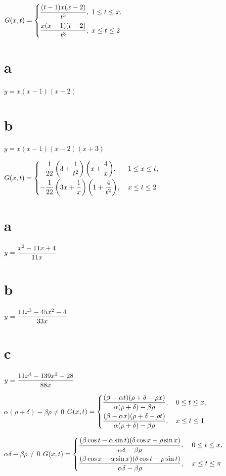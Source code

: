 \smallskip
{}
$G(x,t)=
\begin{cases}
\displaystyle{\frac{(t-1)x(x-2)}{t^{3}}},\;  1\le t\le x,\\[.11in]
\displaystyle{\frac{x(x-1)(t-2)}{t^{3}}},\;   x\le t\le 2
\end{cases}$
\part{a} $y=x(x-1)(x-2)$\;
\part{b} $y=x(x-1)(x-2)(x+3)$

\smallskip
{}
$G(x,t)=
\begin{cases}
-\displaystyle{\frac{1}{22}\left(3+\frac{1}{t^{2}}\right)\left(x+\frac{4}{x}\right)},&\;  1\le x\le t,\\[.11in]
-\displaystyle{\frac{1}{22}\left(3x+\frac{1}{x}\right)\left(1+\frac{4}{t^{2}}\right)},&\;   x\le t\le 2
\end{cases}$
\part{a}
$y=\displaystyle{\frac{x^{2}-11x+4}{11x}}$\;
\part{b}
$y=\displaystyle{\frac{11x^{3}-45x^{2}-4}{33x}}$\;
\part{c}
$y=\displaystyle{\frac{11x^{4}-139x^{2}-28}{88x}}$

\smallskip
{} $\alpha(\rho+\delta)-\beta\rho\ne0$   \quad
$G(x,t)=
\begin{cases}
\displaystyle{\frac{(\beta-\alpha t)(\rho+\delta-\rho x)}
{\alpha(\rho+\delta)-\beta\rho}}, \quad  0\le t\le x, \\[.11in]
\displaystyle{\frac{(\beta-\alpha x)(\rho+\delta-\rho t)}
{\alpha(\rho+\delta)-\beta\rho}},\quad  x\le t\le 1
\end{cases}$

\smallskip
{}
$\alpha\delta-\beta\rho\ne0$  \quad
$G(x,t)=
\begin{cases}
\displaystyle{\frac{(\beta\cos t-\alpha\sin t)(\delta \cos x-\rho\sin
x)}
{\alpha\delta-\beta\rho}},\;    &0\le t\le x,\\[.11in]
\displaystyle{\frac{(\beta\cos x-\alpha\sin x)(\delta \cos t-\rho\sin t)}
{\alpha\delta-\beta\rho}},\;   &x\le t\le \pi
\end{cases}$

